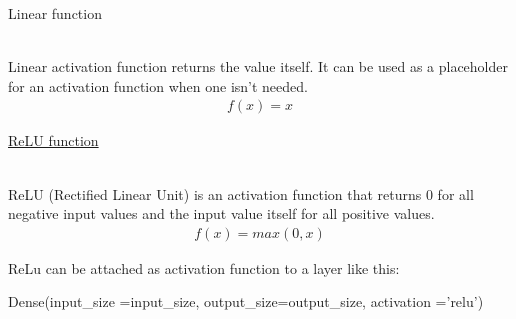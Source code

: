 \documentclass{article}
\begin{document}
    \hypertarget{linear}{Linear function} \\

    Linear activation function returns the value itself. It can be 
    used as a placeholder for an activation function when one isn't 
    needed. \\

    \begin{align*}
        f(x) = x
    \end{align*}
    \begin{center}
    \end{center}

    \hypertarget{relu}{\underline{ReLU function}} \\
    
    ReLU (Rectified Linear Unit) is an activation function that returns 0 for all 
    negative input values and the input value itself for all 
    positive values. \\

    \begin{align*}
        f(x) = max(0, x)
    \end{align*}
    \begin{center}
    \end{center}

    ReLu can be attached as activation function to a layer like this:
\begin{python}
Dense(input_size =input_size,
      output_size=output_size,
      activation ='relu')
\end{python}
    \pagebreak
\end{document}
